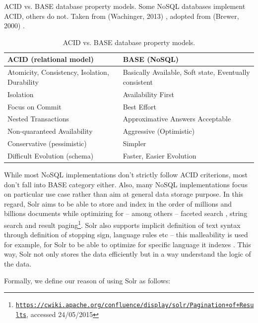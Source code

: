 \begin{table}[htbp]
\caption{ACID vs. BASE database property models.}{ACID vs. BASE database property models. Some NoSQL databases implement ACID, others do not. Taken from (Wachinger, 2013) \citep{wachinger2013next}, adopted from (Brewer, 2000) \citep{brewer2000towards}.
}
\begin{tabularx}{\textwidth}{ | l | X | }
  \hline
  ACID (relational model) & BASE (NoSQL) \\
  \hline
  Atomicity, Consistency, Isolation, Durability & Basically Available, Soft state, Eventually consistent \\
  Isolation & Availability First \\
  Focus on Commit & Best Effort \\
  Nested Transactions & Approximative Answers Acceptable \\
  Non-quaranteed Availability & Aggressive (Optimistic) \\
  Conservative (pessimistic) & Simpler \\
  Difficult Evolution (schema) & Faster, Easier Evolution \\
  \hline
\end{tabularx}
  \label{fig:ACIDvsBASE}
\end{table}

While most NoSQL implementations don't strictly follow ACID criterions, most don't fall into BASE category either. Also, many NoSQL implementations focus on particular use case rather than aim at general data storage purpose. In this regard, Solr aims to be able to store and index in the order of millions and billions documents while optimizing for -- among others -- faceted search \citep{tunkelang2009faceted}, string search and result paging\footnote{\href{https://cwiki.apache.org/confluence/display/solr/Pagination+of+Results}{\texttt{https://cwiki.apache.org/confluence/display/solr/Pagination+of+Results}}, accessed 24/05/2015}. Solr also supports implicit definition of text syntax through definition of stopping sign, language rules etc -- this malleability is used for example, for Solr to be able to optimize for specific language it indexes \citep{grainger2014solr}. This way, Solr not only stores the data efficiently but in a way understand the logic of the data.

Formally, we define our reason of using Solr as follows:


